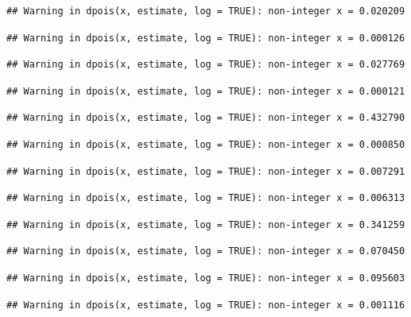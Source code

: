 \documentclass[]{article}
\begin{document}
\begin{verbatim}
## Warning in dpois(x, estimate, log = TRUE): non-integer x = 0.020209
\end{verbatim}

\begin{verbatim}
## Warning in dpois(x, estimate, log = TRUE): non-integer x = 0.000126
\end{verbatim}

\begin{verbatim}
## Warning in dpois(x, estimate, log = TRUE): non-integer x = 0.027769
\end{verbatim}

\begin{verbatim}
## Warning in dpois(x, estimate, log = TRUE): non-integer x = 0.000121
\end{verbatim}

\begin{verbatim}
## Warning in dpois(x, estimate, log = TRUE): non-integer x = 0.432790
\end{verbatim}

\begin{verbatim}
## Warning in dpois(x, estimate, log = TRUE): non-integer x = 0.000850
\end{verbatim}

\begin{verbatim}
## Warning in dpois(x, estimate, log = TRUE): non-integer x = 0.007291
\end{verbatim}

\begin{verbatim}
## Warning in dpois(x, estimate, log = TRUE): non-integer x = 0.006313
\end{verbatim}

\begin{verbatim}
## Warning in dpois(x, estimate, log = TRUE): non-integer x = 0.341259
\end{verbatim}

\begin{verbatim}
## Warning in dpois(x, estimate, log = TRUE): non-integer x = 0.070450
\end{verbatim}

\begin{verbatim}
## Warning in dpois(x, estimate, log = TRUE): non-integer x = 0.095603
\end{verbatim}

\begin{verbatim}
## Warning in dpois(x, estimate, log = TRUE): non-integer x = 0.001116
\end{verbatim}
\end{document}

